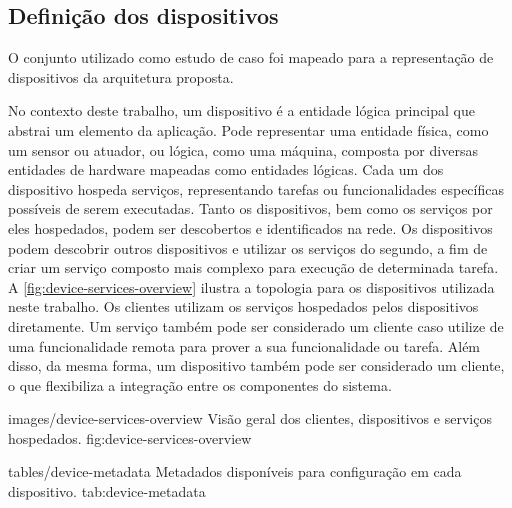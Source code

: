 \subsection{Definição dos dispositivos}

O conjunto utilizado como estudo de caso foi mapeado para a representação de dispositivos da
arquitetura proposta.

No contexto deste trabalho, um dispositivo é a entidade lógica principal que abstrai um elemento da
aplicação. Pode representar uma entidade física, como um sensor ou atuador, ou lógica, como uma
máquina, composta por diversas entidades de hardware mapeadas como entidades lógicas. Cada um dos
dispositivo hospeda serviços, representando tarefas ou funcionalidades específicas possíveis de
serem executadas. Tanto os dispositivos, bem como os serviços por eles hospedados, podem ser
descobertos e identificados na rede. Os dispositivos podem descobrir outros dispositivos e utilizar
os serviços do segundo, a fim de criar um serviço composto mais complexo para execução de
determinada tarefa. A \cref{fig:device-services-overview} ilustra a topologia para os dispositivos
utilizada neste trabalho. Os clientes utilizam os serviços hospedados pelos dispositivos
diretamente. Um serviço também pode ser considerado um cliente caso utilize de uma funcionalidade
remota para prover a sua funcionalidade ou tarefa. Além disso, da mesma forma, um dispositivo também
pode ser considerado um cliente, o que flexibiliza a integração entre os componentes do sistema.

    {images/device-services-overview}
    {Visão geral dos clientes, dispositivos e serviços hospedados.}
    {fig:device-services-overview}

\iffalse
O modelo de dispositivos empregados neste estudo é apresentado na figura\todo{Incluir figura}. Nela,
o dispositivo físico é abstraído por um dispositivo lógico, identificado por\textit{XX*}. O
dispositivo lógico inclui alguns serviços padrão, referenciando funcionalidades que podem ser
encontradas em todos os dispositivos presentes na arquitetura proposta. Dentre os serviços padrão,
tem-se o serviço de implantação de novos serviços. Este serviço permite que outros serviços sejam
adicionados ao dispositivo físico. Além disso, é possível a implantação de novos dispositivos
lógicos, a fim de abstrair componentes da aplicação, juntamente com serviços do
usuário\todo{Melhorar o texto com base na imagem que será incluída.}.
\fi

  {tables/device-metadata}
  {Metadados disponíveis para configuração em cada dispositivo.}
  {tab:device-metadata}


